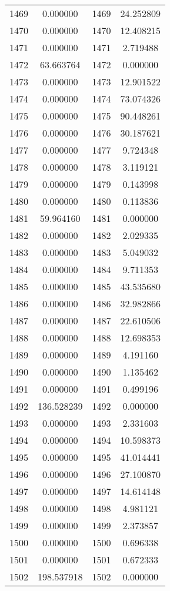 \documentclass[12pt]{article}
\begin{document}
\begin{longtable}{@{}cccc@{}}
1469 & 0.000000 & 1469 & 24.252809 \\
1470 & 0.000000 & 1470 & 12.408215 \\
1471 & 0.000000 & 1471 & 2.719488 \\
1472 & 63.663764 & 1472 & 0.000000 \\
1473 & 0.000000 & 1473 & 12.901522 \\
1474 & 0.000000 & 1474 & 73.074326 \\
1475 & 0.000000 & 1475 & 90.448261 \\
1476 & 0.000000 & 1476 & 30.187621 \\
1477 & 0.000000 & 1477 & 9.724348 \\
1478 & 0.000000 & 1478 & 3.119121 \\
1479 & 0.000000 & 1479 & 0.143998 \\
1480 & 0.000000 & 1480 & 0.113836 \\
1481 & 59.964160 & 1481 & 0.000000 \\
1482 & 0.000000 & 1482 & 2.029335 \\
1483 & 0.000000 & 1483 & 5.049032 \\
1484 & 0.000000 & 1484 & 9.711353 \\
1485 & 0.000000 & 1485 & 43.535680 \\
1486 & 0.000000 & 1486 & 32.982866 \\
1487 & 0.000000 & 1487 & 22.610506 \\
1488 & 0.000000 & 1488 & 12.698353 \\
1489 & 0.000000 & 1489 & 4.191160 \\
1490 & 0.000000 & 1490 & 1.135462 \\
1491 & 0.000000 & 1491 & 0.499196 \\
1492 & 136.528239 & 1492 & 0.000000 \\
1493 & 0.000000 & 1493 & 2.331603 \\
1494 & 0.000000 & 1494 & 10.598373 \\
1495 & 0.000000 & 1495 & 41.014441 \\
1496 & 0.000000 & 1496 & 27.100870 \\
1497 & 0.000000 & 1497 & 14.614148 \\
1498 & 0.000000 & 1498 & 4.981121 \\
1499 & 0.000000 & 1499 & 2.373857 \\
1500 & 0.000000 & 1500 & 0.696338 \\
1501 & 0.000000 & 1501 & 0.672333 \\
1502 & 198.537918 & 1502 & 0.000000 \\

\end{longtable}
\end{document}
